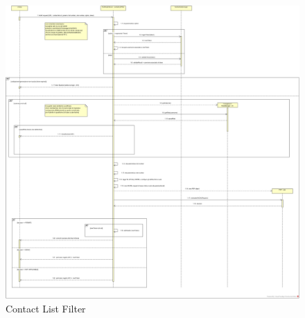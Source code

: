 \begin{figure}[H]
	\centering
	\includegraphics[scale = .6]{img/sequence_contactlist.png}
	\caption{Contact List Filter}
	\label{gfx:contactlistfilter}
\end{figure}

